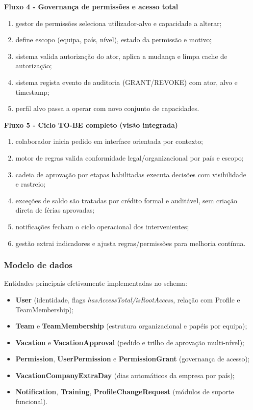 \documentclass[11pt,a4paper]{article}
\begin{document}
\textbf{Fluxo 4 - Governança de permissões e acesso total}
\begin{enumerate}
  \item gestor de permissões seleciona utilizador-alvo e capacidade a alterar;
  \item define escopo (equipa, país, nível), estado da permissão e motivo;
  \item sistema valida autorização do ator, aplica a mudança e limpa cache de autorização;
  \item sistema regista evento de auditoria (GRANT/REVOKE) com ator, alvo e timestamp;
  \item perfil alvo passa a operar com novo conjunto de capacidades.
\end{enumerate}

\textbf{Fluxo 5 - Ciclo TO-BE completo (visão integrada)}
\begin{enumerate}
  \item colaborador inicia pedido em interface orientada por contexto;
  \item motor de regras valida conformidade legal/organizacional por país e escopo;
  \item cadeia de aprovação por etapas habilitadas executa decisões com visibilidade e rastreio;
  \item exceções de saldo são tratadas por crédito formal e auditável, sem criação direta de férias aprovadas;
  \item notificações fecham o ciclo operacional dos intervenientes;
  \item gestão extrai indicadores e ajusta regras/permissões para melhoria contínua.
\end{enumerate}

\subsubsection{Modelo de dados}
Entidades principais efetivamente implementadas no schema:

\begin{itemize}
  \item \textbf{User} (identidade, flags \textit{hasAccessTotal/isRootAccess}, relação com Profile e TeamMembership);
  \item \textbf{Team} e \textbf{TeamMembership} (estrutura organizacional e papéis por equipa);
  \item \textbf{Vacation} e \textbf{VacationApproval} (pedido e trilho de aprovação multi-nível);
  \item \textbf{Permission}, \textbf{UserPermission} e \textbf{PermissionGrant} (governança de acesso);
  \item \textbf{VacationCompanyExtraDay} (dias automáticos da empresa por país);
  \item \textbf{Notification}, \textbf{Training}, \textbf{ProfileChangeRequest} (módulos de suporte funcional).
\end{itemize}
\end{document}
